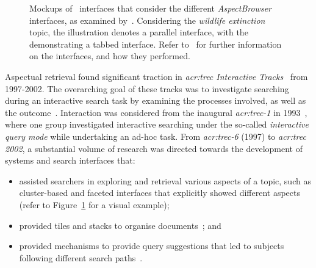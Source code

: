 \begin{figure}[t!]
    \centering
    \caption[Mockups of aspect-based retrieval system interfaces]{Mockups of \searchlogo~interfaces that consider the different \emph{AspectBrowser} interfaces, as examined by~\cite{villa2009aspect_interface}. Considering the \emph{wildlife extinction} topic, the  illustration denotes a parallel interface, with the  demonstrating a tabbed interface. Refer to~\cite{villa2009aspect_interface} for further information on the interfaces, and how they performed.}
    \label{fig:tabbed_interface}
\end{figure}

Aspectual retrieval found significant traction in \emph{\gls{acr:trec} Interactive Tracks}~\citep{over2001trec} from 1997-2002. The overarching goal of these tracks was to investigate searching during an interactive search task by examining the processes involved, as well as the outcome~\citep{over2001trec}. Interaction was considered from the inaugural \emph{\gls{acr:trec}-1} in 1993~\citep{harman1993trec1}, where one group investigated interactive searching under the so-called \emph{interactive query mode} while undertaking an ad-hoc task. From \emph{\gls{acr:trec}-6} (1997) to \emph{\gls{acr:trec} 2002}, a substantial volume of research was directed towards the development of systems and search interfaces that:

\begin{itemize}
    \item{assisted searchers in exploring and retrieval various aspects of a topic, such as cluster-based and faceted interfaces that explicitly showed different aspects~\citep{mcdonald1998interactive, villa2009aspect_interface} (refer to Figure~\ref{fig:tabbed_interface} for a visual example);}
    \item{provided tiles and stacks to organise documents~\citep{hearst1995tilebars, hearst1997texttiling, harper2006piling, iwata2012tilediversified}; and}
    \item{provided mechanisms to provide query suggestions that led to subjects following different search paths~\citep{kato2012query_suggestion, umemoto2016scentbar}.}
\end{itemize}

